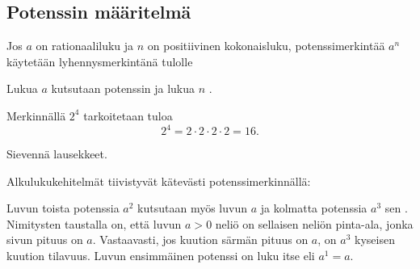 \subsection{Potenssin määritelmä}

Jos $a$ on rationaaliluku ja $n$ on positiivinen kokonaisluku, potenssimerkintää $a^n$ käytetään lyhennysmerkintänä tulolle
   
\laatikko[Potenssi]{    \[
        a^n = \underbrace{a\cdot \ldots \cdot a}_{n\text{ kpl}}. 
    \]}
    
Lukua $a$ kutsutaan potenssin  ja lukua $n$ .

\begin{esimerkki}
Merkinnällä $2^4$ tarkoitetaan tuloa 
        \[
            2^4=2\cdot 2\cdot 2\cdot 2=16.
        \]
\end{esimerkki}

\begin{esimerkki}
Sievennä lausekkeet.
	\begin{esimratk}
	
	\end{esimratk}
	
	\begin{esimvast}
	\end{esimvast}
\end{esimerkki}

\begin{esimerkki} %
Alkulukukehitelmät tiivistyvät kätevästi potenssimerkinnällä:
\end{esimerkki}

Luvun toista potenssia $a^2$ kutsutaan myös luvun $a$  ja kolmatta potenssia $a^3$ sen . Nimitysten taustalla on, että luvun $a>0$ neliö on sellaisen neliön pinta-ala, jonka sivun pituus on $a$. Vastaavasti, jos kuution särmän pituus on $a$, on $a^3$ kyseisen kuution tilavuus. Luvun ensimmäinen potenssi on luku itse eli $a^1 = a$. %

